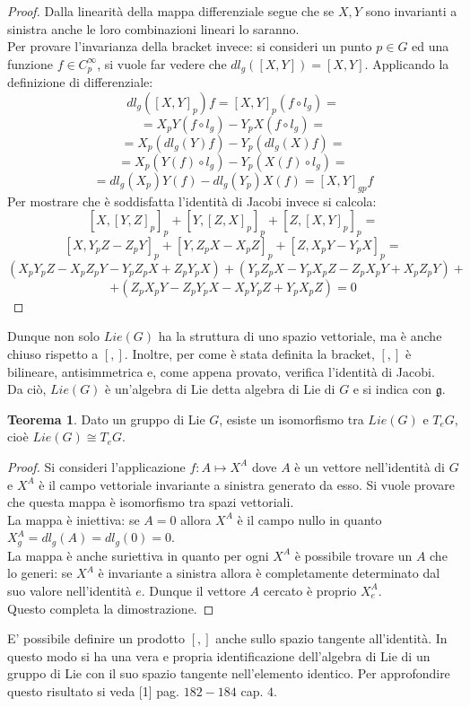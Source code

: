 \documentclass[12pt,a4paper]{report}
\theoremstyle{definition}
\newtheorem{Theo}[Def]{Teorema}
\theoremstyle{definition}
\theoremstyle{definition}
\theoremstyle{remark}
\begin{document}
\begin{proof}
	Dalla linearità della mappa differenziale segue che se $X,Y$ sono invarianti a sinistra anche le loro combinazioni lineari lo saranno.\\
	Per provare l'invarianza della bracket invece: si consideri un punto $p\in G$ ed una funzione $f\in C^\infty_p$, si vuole far vedere che $dl_g([X,Y])=[X,Y]$.
	Applicando la definizione di differenziale: $$dl_g([X,Y]_p)f=[X,Y]_p(f\circ l_g)=$$$$=X_pY(f\circ l_g)-Y_pX(f\circ l_g)=$$$$=X_p(dl_g(Y)f)-Y_p(dl_g(X)f)=$$
	$$=X_p(Y(f)\circ l_g)-Y_p(X(f)\circ l_g)=$$
	$$=dl_g(X_p)Y(f)-dl_g(Y_p)X(f)=[X,Y]_{gp}f$$ 
	Per mostrare che è soddisfatta l'identità di Jacobi invece si calcola:
	$$[X,[Y,Z]_p]_p+[Y,[Z,X]_p]_p+[Z,[X,Y]_p]_p=$$
	$$[X,Y_pZ-Z_pY]_p+[Y,Z_pX-X_pZ]_p+[Z,X_pY-Y_pX]_p=$$
	$$(X_pY_pZ-X_pZ_pY-Y_pZ_pX+Z_pY_pX)+(Y_pZ_pX-Y_pX_pZ-Z_pX_pY+X_pZ_pY)+$$$$+(Z_pX_pY-Z_pY_pX-X_pY_pZ+Y_pX_pZ)=0$$
\end{proof}
Dunque non solo $Lie(G)$ ha la struttura di uno spazio vettoriale, ma è anche chiuso rispetto a $[,]$. Inoltre, per come è stata definita la bracket, $[,]$ è bilineare, antisimmetrica e, come appena provato, verifica l'identità di Jacobi.\\
Da ciò, $Lie(G)$ è un'algebra di Lie detta algebra di Lie di $G$ e si indica con $\mathfrak{g}$.
\begin{Theo}
	Dato un gruppo di Lie $G$, esiste un isomorfismo tra $Lie(G)$ e $T_eG$, cioè $Lie(G)\cong T_eG$.
\end{Theo}
\begin{proof}
	Si consideri l'applicazione $f:A\mapsto X^A$ dove $A$ è un vettore nell'identità di $G$ e $X^A$ è il campo vettoriale invariante a sinistra generato da esso. Si vuole provare che questa mappa è isomorfismo tra spazi vettoriali.\\
	La mappa è iniettiva: se $A=0$ allora $X^A$ è il campo nullo in quanto $X^A_g=dl_g(A)=dl_g(0)=0$.\\
	La mappa è anche suriettiva in quanto per ogni $X^A$ è possibile trovare un $A$ che lo generi: se $X^A$ è invariante a sinistra allora è completamente determinato dal suo valore nell'identità $e$. Dunque il vettore $A$ cercato è proprio $X^A_e$.\\
	Questo completa la dimostrazione.  
\end{proof}
E' possibile definire un prodotto $[,]$ anche sullo spazio tangente all'identità. In questo modo si ha una vera e propria identificazione dell'algebra di Lie di un gruppo di Lie con il suo spazio tangente nell'elemento identico. Per approfondire questo risultato si veda [1] pag. $182-184$ cap. $4$.
\end{document}

